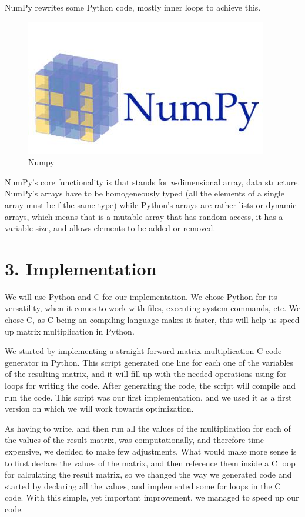 \documentclass{article}
\begin{document}
NumPy rewrites some Python code, mostly inner loops to achieve this.

\begin{figure}[H]
\begin{center}
\includegraphics[scale=.3]{numpy}
\end{center}
\caption{Numpy}
\end{figure}

NumPy's core functionality is  that stands for \textit{n}-dimensional array, data structure. NumPy's arrays have to be homogeneously typed (all the elements of a single array must be f the same type) while Python's arrays are rather lists or dynamic arrays, which means that is a mutable array that has random access, it has a variable size, and allows elements to be added or removed.

\section*{3. Implementation}

We will use Python and C for our implementation. We chose Python for its versatility, when it comes to work with files, executing system commands, etc. We chose C, as C being an compiling language makes it faster, this will help us speed up matrix multiplication in Python.

We started by implementing a straight forward matrix multiplication C code generator in Python. This script generated one line for each one of the variables of the resulting matrix, and it will fill up with the needed operations using for loops for writing the code. After generating the code, the script will compile and run the code. This script was our first implementation, and we used it as a first version on which we will work towards optimization.

As having to write, and then run all the values of the multiplication for each of the values of the result matrix, was computationally, and therefore time expensive, we decided to make few adjustments. What would make more sense is to first declare the values of the matrix, and then reference them inside a C loop for calculating the result matrix, so we changed the way we generated code and started by declaring all the values, and implemented some for loops in the C code. With this simple, yet important improvement, we managed to speed up our code. 
\end{document}

